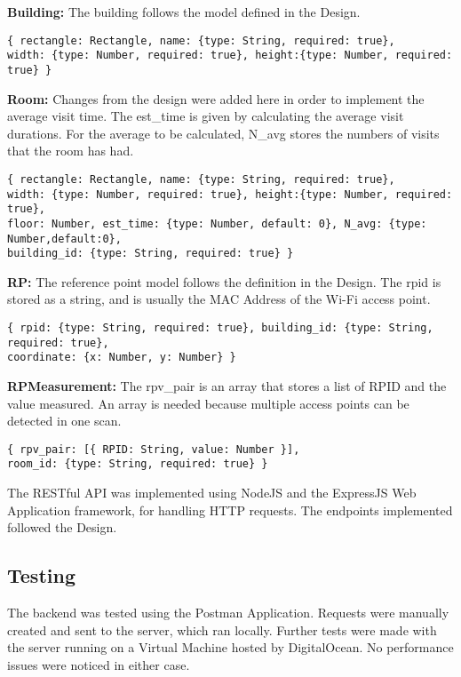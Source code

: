 \noindent
\textbf{Building:}
The building follows the model defined in the Design. 
\begin{lstlisting}
{ rectangle: Rectangle, name: {type: String, required: true},
width: {type: Number, required: true}, height:{type: Number, required: true} }
\end{lstlisting}

\noindent
\textbf{Room:}
Changes from the design were added here in order to implement the average visit time. The est\_time is given by calculating the average visit durations. For the average to be calculated, N\_avg stores the numbers of visits that the room has had.
\begin{lstlisting}
{ rectangle: Rectangle, name: {type: String, required: true},
width: {type: Number, required: true}, height:{type: Number, required: true},
floor: Number, est_time: {type: Number, default: 0}, N_avg: {type: Number,default:0},
building_id: {type: String, required: true} }
\end{lstlisting}

\noindent
\textbf{RP:}
The reference point model follows the definition in the Design. The rpid is stored as a string, and is usually the MAC Address of the Wi-Fi access point.
\begin{lstlisting}
{ rpid: {type: String, required: true}, building_id: {type: String, required: true},
coordinate: {x: Number, y: Number} }
\end{lstlisting}

\noindent
\textbf{RPMeasurement:}
The rpv\_pair is an array that stores a list of RPID and the value measured. An array is needed because multiple access points can be detected in one scan. 
\begin{lstlisting}
{ rpv_pair: [{ RPID: String, value: Number }], 
room_id: {type: String, required: true} }
\end{lstlisting}

The RESTful API was implemented using NodeJS and the ExpressJS Web Application framework, for handling HTTP requests. The endpoints implemented followed the Design.

\subsection{Testing}
The backend was tested using the Postman Application. Requests were manually created and sent to the server, which ran locally. Further tests were made with the server running on a Virtual Machine hosted by DigitalOcean. No performance issues were noticed in either case.

